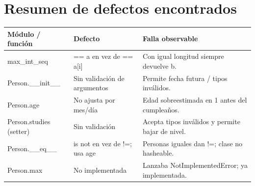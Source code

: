 \documentclass[11pt,a4paper]{article}
\newcommand{\code}[1]{\colorbox{codebg}{\ttfamily\small #1}}
\begin{document}
\section*{\normalsize\color{brand}Resumen de defectos encontrados}
\vspace{-0.3em}
\begin{center}
\small
\begin{tabular}{@{}p{2.6cm}p{4.5cm}p{7.2cm}@{}}
\toprule
\textbf{Módulo / función} & \textbf{Defecto} & \textbf{Falla observable} \\
\midrule
\code{max\_int\_seq} & \code{== a} en vez de \code{== a[i]} & Con igual longitud siempre devuelve \code{b}. \\
\code{Person.\_\_init\_\_} & Sin validación de argumentos & Permite fecha futura / tipos inválidos. \\
\code{Person.age} & No ajusta por mes/día & Edad sobreestimada en 1 antes del cumpleaños. \\
\code{Person.studies} (setter) & Sin validación & Acepta tipos inválidos y permite bajar de nivel. \\
\code{Person.\_\_eq\_\_} & \code{is not} en vez de \code{!=}; usa \code{age} & Personas iguales dan \code{!=}; clase no hasheable. \\
\code{Person.max} & No implementada & Lanzaba \code{NotImplementedError}; ya implementada. \\
\bottomrule
\end{tabular}
\end{center}
\end{document}
